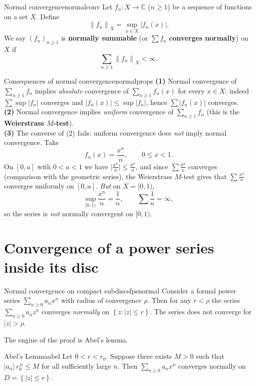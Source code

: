 \documentclass[11pt,openany]{report}
\newcommand{\C}{\mathbb{C}}
\newcommand{\abs}[1]{\left\lvert #1 \right\rvert}
\newcommand{\norm}[1]{\left\lVert #1 \right\rVert}
\newcommand{\set}[1]{\left\{ #1 \right\}}
\begin{document}
\begin{definition}{Normal convergence}{normalconv}
Let $f_n:X\to\C$ ($n\ge1$) be a sequence of functions on a set $X$. Define
\[
  \norm{f_n}_X = \sup_{x\in X}\abs{f_n(x)}.
\]
We say $(f_n)_{n\ge1}$ is \textbf{normally summable} (or $\sum f_n$ \textbf{converges
normally}) on $X$ if
\[
  \sum_{n\ge1}\norm{f_n}_X < \infty.
\]
\end{definition}

\begin{example}{Consequences of normal convergence}{normalprops}
\textbf{(1)} Normal convergence of $\sum_{n\ge1} f_n$ implies \emph{absolute} convergence
of $\sum_{n\ge1} f_n(x)$ for every $x\in X$: indeed $\sum\sup\abs{f_n}$ converges and
$\abs{f_n(x)}\le\sup\abs{f_n}$, hence $\sum\abs{f_n(x)}$ converges.\\[3pt]
\textbf{(2)} Normal convergence implies \emph{uniform} convergence of $\sum_{n\ge1}f_n$
(this is the \textbf{Weierstrass $M$-test}).\\[3pt]
\textbf{(3)} The converse of (2) fails: uniform convergence does \emph{not} imply normal
convergence. Take
\[
  f_n(x)=\frac{x^n}{n}, \qquad 0\le x<1.
\]
On $[0,a]$ with $0<a<1$ we have $\bigl\lvert\frac{x^n}{n}\bigr\rvert\le\frac{a^n}{n}$, and
since $\sum\frac{a^n}{n}$ converges (comparison with the geometric series), the
Weierstrass $M$-test gives that $\sum\frac{x^n}{n}$ converges uniformly on $[0,a]$.
\emph{But} on $X=[0,1)$,
\[
  \sup_{[0,1)}\frac{x^n}{n} = \frac1n, \qquad \sum\frac1n = \infty,
\]
so the series is \emph{not} normally convergent on $[0,1)$.
\end{example}

\section{Convergence of a power series inside its disc}

\begin{theorem}{Normal convergence on compact subdiscs}{fpsnormal}
Consider a formal power series $\sum_{n\ge0}a_n x^n$ with radius of convergence $\rho$.
Then for any $r<\rho$ the series $\sum_{n\ge0}a_n z^n$ converges \emph{normally} on
$\set{ z : \abs{z}\le r }$. The series does not converge for $\abs{z}>\rho$.
\end{theorem}

The engine of the proof is Abel's lemma.

\begin{lemma}{Abel's Lemma}{abel}
Let $0<r<r_0$. Suppose there exists $M>0$ such that $\abs{a_n}\,r_0^{\,n}\le M$ for all
sufficiently large $n$. Then $\sum_{n\ge0}a_n x^n$ converges normally on
$D=\set{ \abs{z}\le r }$.
\end{lemma}
\end{document}
